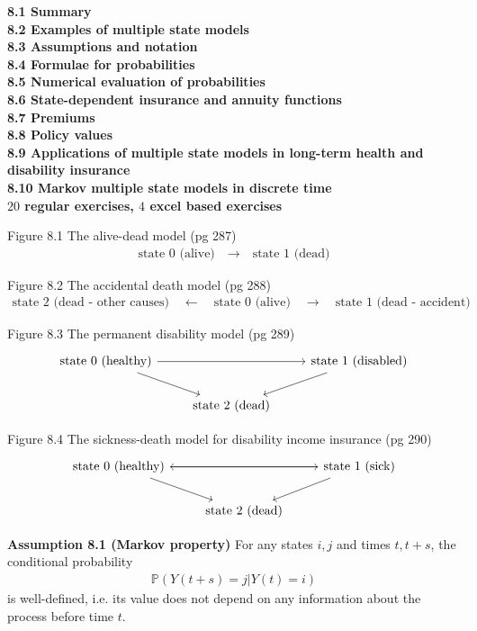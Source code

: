 \documentclass[hidelinks, 12pt]{article}
\theoremstyle{mydefstyle}
\theoremstyle{mythmstyle}
\newcounter{prop}
\begin{document}
\textbf{8.1 Summary} \\
\textbf{8.2 Examples of multiple state models} \\
\textbf{8.3 Assumptions and notation} \\
\textbf{8.4 Formulae for probabilities} \\
\textbf{8.5 Numerical evaluation of probabilities} \\
\textbf{8.6 State-dependent insurance and annuity functions} \\
\textbf{8.7 Premiums} \\
\textbf{8.8 Policy values} \\
\textbf{8.9 Applications of multiple state models in long-term health and disability insurance} \\
\textbf{8.10 Markov multiple state models in discrete time} \\
\textbf{$20$ regular exercises, $4$ excel based exercises}

Figure 8.1 The alive-dead model (pg 287)
\begin{gather*}
\mbox{state 0 (alive)} \quad\longrightarrow\quad \mbox{state 1 (dead)}
\end{gather*}

Figure 8.2 The accidental death model (pg 288)
\begin{gather*}
\mbox{state 2 (dead - other causes)} \quad \longleftarrow \quad \mbox{state 0 (alive)} \quad \longrightarrow \quad \mbox{state 1 (dead - accident)}
\end{gather*}

Figure 8.3 The permanent disability model (pg 289)
\[\begin{tikzcd}
\mbox{state 0 (healthy)} \arrow{rr} \arrow{dr} & & \mbox{state 1 (disabled)} \arrow{dl} \\
& \mbox{state 2 (dead)} &
\end{tikzcd}\]

Figure 8.4 The sickness-death model for disability income insurance (pg 290)
\[\begin{tikzcd}
\mbox{state 0 (healthy)} \arrow{rr} \arrow{dr} & & \mbox{state 1 (sick)} \arrow{ll} \arrow{dl} \\
& \mbox{state 2 (dead)} &
\end{tikzcd}\]

\textbf{Assumption 8.1 (Markov property)} For any states $i, j$ and times $t, t + s$, the conditional probability
\begin{gather*}
\mathbb{P}(Y(t + s) = j \vert Y(t) = i)
\end{gather*}
is well-defined, i.e. its value does not depend on any information about the process before time $t$.
\end{document}
